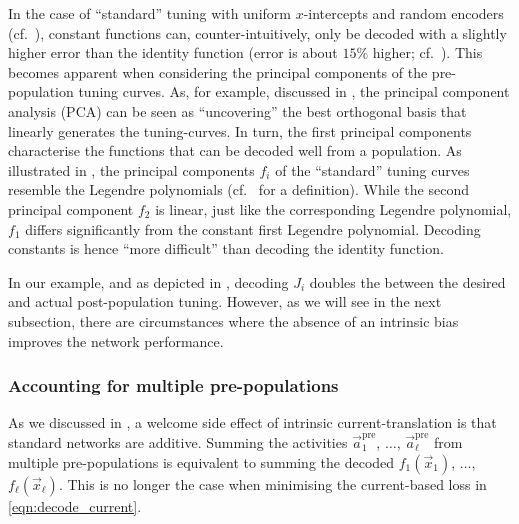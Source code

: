 In the case of \enquote{standard} \NEF tuning with uniform $x$-intercepts and random encoders (cf.~), constant functions can, counter-intuitively, only be decoded with a slightly higher error than the identity function (error is about $15\%$ higher; cf.~).
This becomes apparent when considering the principal components of the pre-population tuning curves.
As, for example, discussed in \citet[Chapter~7]{eliasmith2003neural}, the principal component analysis (PCA) can be seen as \enquote{uncovering} the best orthogonal basis that linearly generates the tuning-curves.
In turn, the first principal components characterise the functions that can be decoded well from a population.
As illustrated in , the principal components $f_i$ of the \enquote{standard} \NEF tuning curves resemble the Legendre polynomials (cf.~ for a definition).
While the second principal component $f_2$ is linear, just like the corresponding Legendre polynomial, $f_1$ differs significantly from the constant first Legendre polynomial.
Decoding constants is hence \enquote{more difficult} than decoding the identity function.

In our example, and as depicted in , decoding $J_i$ doubles the \RMSE between the desired and actual post-population tuning.
However, as we will see in the next subsection, there are circumstances where the absence of an intrinsic bias improves the network performance.

\subsubsection{Accounting for multiple pre-populations}
As we discussed in , a welcome side effect of intrinsic current-translation is that standard \NEF networks are additive.
Summing the activities $\vec a^\mathrm{pre}_1$, $\ldots$, $\vec a^\mathrm{pre}_\ell$ from multiple pre-populations is equivalent to summing the decoded $f_1(\vec x_1)$, $\ldots$, $f_\ell(\vec x_\ell)$.
This is no longer the case when
minimising the current-based loss in \cref{eqn:decode_current}.

